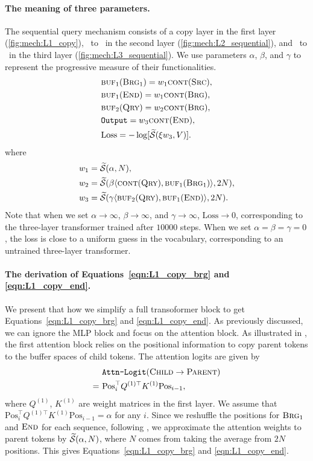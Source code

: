 \paragraph{The meaning of three parameters.} The sequential query mechanism consists of a copy layer in the first layer (\cref{fig:mech:L1_copy}), \query~to \brg~in the second layer (\cref{fig:mech:L2_sequential}), and \query~to \ed~in the third layer (\cref{fig:mech:L3_sequential}).
We use parameters $\alpha$, $\beta$, and $\gamma$ to represent the progressive measure of their functionalities.
\begin{align}
&\textsc{buf}_1(\textsc{Brg$_1$})=w_1\textsc{cont}(\textsc{Src}), \label{eqn:L1_copy_brg}\\
&\textsc{buf}_1(\textsc{End})=w_1\textsc{cont}(\textsc{Brg}), \label{eqn:L1_copy_end}\\
&\textsc{buf}_2(\textsc{Qry})=w_2\textsc{cont}(\textsc{Brg}),  \label{eqn:L2_seq_qry}\\
&\texttt{Output}=w_3 \textsc{cont}(\textsc{End}), \label{eqn:L3_output}\\
&\text{Loss} = -\log[\widetilde{\mathcal{S}}(\xi w_3, V)].\label{eqn:loss}
\end{align}
where
\begin{align*}
w_1&=\widetilde{\mathcal{S}}(\alpha,N), \\
w_2&=\widetilde{\mathcal{S}}(\beta\langle\textsc{cont}(\textsc{Qry}),\textsc{buf}_1(\textsc{Brg$_1$})\rangle,2N),\\
w_3&=\widetilde{\mathcal{S}}(\gamma\langle\textsc{buf}_2(\textsc{Qry}),\textsc{buf}_1(\textsc{End})\rangle,2N).
\end{align*}
Note that when we set $\alpha\to\infty$, $\beta\to\infty$, and $\gamma\to\infty$, $\text{Loss}\to 0$, corresponding to the three-layer transformer trained after $10000$ steps. When we set $\alpha=\beta=\gamma=0$, the loss is close to a uniform guess in the vocabulary, corresponding to an untrained three-layer transformer. 

\paragraph{The derivation of Equations~\eqref{eqn:L1_copy_brg} and \eqref{eqn:L1_copy_end}.} We present that how we simplify a full transoformer block to get Equations~\eqref{eqn:L1_copy_brg} and \eqref{eqn:L1_copy_end}. As previously discussed, we can ignore the MLP block and focus on the attention block.
As illustrated in , the first attention block relies on the positional information to copy parent tokens to the buffer spaces of child tokens. The attention logits are given by
\begin{align*}
~&\texttt{Attn-Logit}(\textsc{Child}\to\textsc{Parent})\\
=~&\text{Pos}_i^\top Q^{(1)\top}K^{(1)} \text{Pos}_{i-1}, 
\end{align*}
where $Q^{(1)}$, $K^{(1)}$ are weight matrices in the first layer. We assume that $\text{Pos}_i^\top Q^{(1)\top}K^{(1)} \text{Pos}_{i-1}=\alpha$ for any $i$. Since we reshuffle the positions for $\textsc{Brg$_1$}$ and $\textsc{End}$ for each sequence, following \citet{reddy2023mechanistic}, we approximate the attention weights to parent tokens by $\widetilde{\mathcal{S}}(\alpha, N)$, where $N$ comes from taking the average from  $2N$ positions. This gives Equations~\eqref{eqn:L1_copy_brg} and \eqref{eqn:L1_copy_end}.

